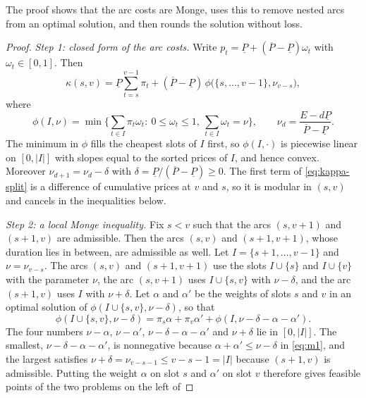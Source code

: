 \documentclass[11pt]{article}
\begin{document}
The proof shows that the arc costs are Monge, uses this to remove nested arcs from an optimal solution, and then rounds
the solution without loss.

\begin{proof}
\emph{Step 1: closed form of the arc costs.} Write $p_t=\underline P+(\overline P-\underline P)\omega_t$ with
$\omega_t\in[0,1]$. Then
\begin{equation}\label{eq:kappa-split}
\kappa(s,v)=\underline P\sum_{t=s}^{v-1}\pi_t+(\overline P-\underline P)\,\phi\big(\{s,\dots,v-1\},\nu_{v-s}\big),
\end{equation}
where
\[
\phi(I,\nu)=\min\Big\{\sum_{t\in I}\pi_t\omega_t:\ 0\le\omega_t\le1,\ \sum_{t\in I}\omega_t=\nu\Big\},\qquad
\nu_d=\frac{E-d\underline P}{\overline P-\underline P}.
\]
The minimum in $\phi$ fills the cheapest slots of $I$ first, so $\phi(I,\cdot)$ is piecewise linear on $[0,|I|]$ with
slopes equal to the sorted prices of $I$, and hence convex. Moreover $\nu_{d+1}=\nu_d-\delta$ with
$\delta=\underline P/(\overline P-\underline P)\ge0$. The first term of \eqref{eq:kappa-split} is a difference of
cumulative prices at $v$ and $s$, so it is modular in $(s,v)$ and cancels in the inequalities below.

\emph{Step 2: a local Monge inequality.} Fix $s<v$ such that the arcs $(s,v+1)$ and $(s+1,v)$ are admissible. Then
the arcs $(s,v)$ and $(s+1,v+1)$, whose duration lies in between, are admissible as well. Let $I=\{s+1,\dots,v-1\}$ and
$\nu=\nu_{v-s}$. The arcs $(s,v)$ and $(s+1,v+1)$ use the slots $I\cup\{s\}$ and $I\cup\{v\}$ with the parameter $\nu$,
the arc $(s,v+1)$ uses $I\cup\{s,v\}$ with $\nu-\delta$, and the arc $(s+1,v)$ uses $I$ with $\nu+\delta$. Let
$\alpha$ and $\alpha'$ be the weights of slots $s$ and $v$ in an optimal solution of $\phi(I\cup\{s,v\},\nu-\delta)$,
so that
\begin{equation}\label{eq:m1}
\phi(I\cup\{s,v\},\nu-\delta)=\pi_s\alpha+\pi_v\alpha'+\phi(I,\nu-\delta-\alpha-\alpha').
\end{equation}
The four numbers $\nu-\alpha$, $\nu-\alpha'$, $\nu-\delta-\alpha-\alpha'$ and $\nu+\delta$ lie in $[0,|I|]$. The smallest,
$\nu-\delta-\alpha-\alpha'$, is nonnegative because $\alpha+\alpha'\le\nu-\delta$ in \eqref{eq:m1}, and the largest satisfies
$\nu+\delta=\nu_{v-s-1}\le v-s-1=|I|$ because $(s+1,v)$ is admissible. Putting the weight $\alpha$ on slot $s$ and $\alpha'$
on slot $v$ therefore gives feasible points of the two problems on the left of


\end{proof}
\end{document}

